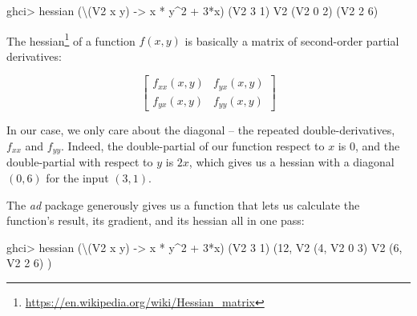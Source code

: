 \documentclass[]{article}
\newenvironment{Shaded}{}{}
\newcommand{\DataTypeTok}[1]{\textcolor[rgb]{0.56,0.13,0.00}{#1}}
\newcommand{\DecValTok}[1]{\textcolor[rgb]{0.25,0.63,0.44}{#1}}
\newcommand{\NormalTok}[1]{#1}
\newcommand{\OperatorTok}[1]{\textcolor[rgb]{0.40,0.40,0.40}{#1}}
\newcommand{\OtherTok}[1]{\textcolor[rgb]{0.00,0.44,0.13}{#1}}
\renewcommand{\href}[2]{#2\footnote{\url{#1}}}
\begin{document}
\begin{Shaded}
\begin{Highlighting}[]
\NormalTok{ghci}\OperatorTok{\textgreater{}}\NormalTok{ hessian (\textbackslash{}(}\DataTypeTok{V2}\NormalTok{ x y) }\OtherTok{{-}\textgreater{}}\NormalTok{ x }\OperatorTok{*}\NormalTok{ y}\OperatorTok{\^{}}\DecValTok{2} \OperatorTok{+} \DecValTok{3}\OperatorTok{*}\NormalTok{x) (}\DataTypeTok{V2} \DecValTok{3} \DecValTok{1}\NormalTok{)}
\DataTypeTok{V2}\NormalTok{ (}\DataTypeTok{V2} \DecValTok{0} \DecValTok{2}\NormalTok{)}
\NormalTok{   (}\DataTypeTok{V2} \DecValTok{2} \DecValTok{6}\NormalTok{)}
\end{Highlighting}
\end{Shaded}

The \href{https://en.wikipedia.org/wiki/Hessian_matrix}{hessian} of a function
\(f(x,y)\) is basically a matrix of second-order partial derivatives:

\[
\begin{bmatrix}
f_{xx}(x, y) & f_{yx}(x, y) \\
f_{yx}(x, y) & f_{yy}(x, y)
\end{bmatrix}
\]

In our case, we only care about the diagonal -- the repeated double-derivatives,
\(f_{xx}\) and \(f_{yy}\). Indeed, the double-partial of our function respect to
\(x\) is \(0\), and the double-partial with respect to \(y\) is \(2x\), which
gives us a hessian with a diagonal \((0, 6)\) for the input \((3, 1)\).

The \emph{ad} package generously gives us a function that lets us calculate the
function's result, its gradient, and its hessian all in one pass:

\begin{Shaded}
\begin{Highlighting}[]
\NormalTok{ghci}\OperatorTok{\textgreater{}}\NormalTok{ hessian\textquotesingle{} (\textbackslash{}(}\DataTypeTok{V2}\NormalTok{ x y) }\OtherTok{{-}\textgreater{}}\NormalTok{ x }\OperatorTok{*}\NormalTok{ y}\OperatorTok{\^{}}\DecValTok{2} \OperatorTok{+} \DecValTok{3}\OperatorTok{*}\NormalTok{x) (}\DataTypeTok{V2} \DecValTok{3} \DecValTok{1}\NormalTok{)}
\NormalTok{(}\DecValTok{12}\NormalTok{, }\DataTypeTok{V2}\NormalTok{ (}\DecValTok{4}\NormalTok{, }\DataTypeTok{V2} \DecValTok{0} \DecValTok{3}\NormalTok{)}
     \DataTypeTok{V2}\NormalTok{ (}\DecValTok{6}\NormalTok{, }\DataTypeTok{V2} \DecValTok{2} \DecValTok{6}\NormalTok{)}
\NormalTok{)}
\end{Highlighting}
\end{Shaded}
\end{document}
